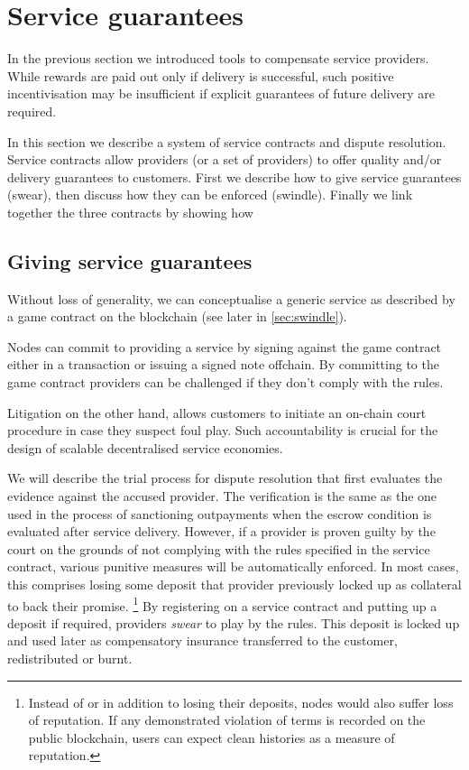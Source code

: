 \section{Service guarantees}
\label{sec:courtroom}

In the previous section we introduced tools to compensate service providers.
While rewards are paid out only if delivery is successful,
such positive incentivisation may be insufficient if
explicit guarantees of future delivery are required.

In this section we describe a system of service contracts and dispute resolution.
Service contracts allow providers (or a set of providers)
to offer quality and/or delivery guarantees to customers.
First we describe how to give service guarantees (swear), then discuss how they can be enforced (swindle).
Finally we link together the three contracts by showing how 


\subsection{Giving service guarantees}

Without loss of generality, we can conceptualise a generic service as described by a game contract
on the blockchain (see later in \ref{sec:swindle}).


Nodes can commit to providing a service by signing against the game contract
either in a transaction or issuing a signed note offchain.
By committing to the game contract  providers can be challenged if they don't comply with the rules.

Litigation on the other hand, allows customers to initiate an on-chain court procedure
in case they suspect foul play. Such accountability is
crucial for the design of scalable decentralised service economies.

We will describe the trial process for dispute
resolution that first evaluates the evidence against the accused provider.
The verification is the same as the one used in the process of sanctioning outpayments when the escrow condition is evaluated after service delivery.
However, if a provider is proven guilty by the court on the grounds of not complying with the rules specified in the service contract, various punitive measures will be
automatically enforced. In most cases, this comprises losing some deposit that
provider previously locked up as collateral to back their promise.%
%
\footnote{Instead of or in addition to losing their deposits, nodes would also
suffer loss of reputation. If any demonstrated violation of terms is
recorded on the public blockchain, users can expect clean histories as a measure
of reputation.}
%
By registering on a service contract and putting up a deposit if required, providers
\emph{swear} to play by the rules.
This deposit is locked up and used later as compensatory insurance transferred to the
customer, redistributed or burnt.

